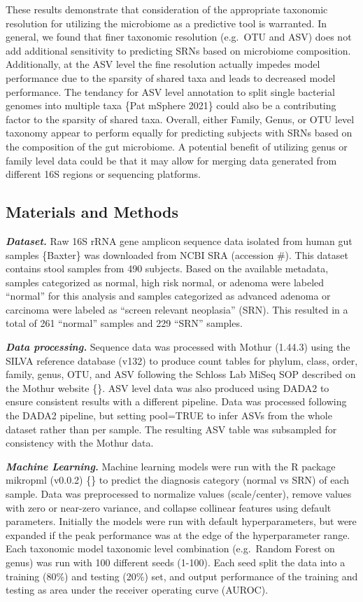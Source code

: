 \documentclass[
]{article}
\begin{document}
These results demonstrate that consideration of the appropriate
taxonomic resolution for utilizing the microbiome as a predictive tool
is warranted. In general, we found that finer taxonomic resolution
(e.g.~OTU and ASV) does not add additional sensitivity to predicting
SRNs based on microbiome composition. Additionally, at the ASV level the
fine resolution actually impedes model performance due to the sparsity
of shared taxa and leads to decreased model performance. The tendancy
for ASV level annotation to split single bacterial genomes into multiple
taxa \{Pat mSphere 2021\} could also be a contributing factor to the
sparsity of shared taxa. Overall, either Family, Genus, or OTU level
taxonomy appear to perform equally for predicting subjects with SRNs
based on the composition of the gut microbiome. A potential benefit of
utilizing genus or family level data could be that it may allow for
merging data generated from different 16S regions or sequencing
platforms.

\hypertarget{materials-and-methods}{%
\subsection{Materials and Methods}\label{materials-and-methods}}

\textbf{\emph{Dataset.}} Raw 16S rRNA gene amplicon sequence data
isolated from human gut samples \{Baxter\} was downloaded from NCBI SRA
(accession \#). This dataset contains stool samples from 490 subjects.
Based on the available metadata, samples categorized as normal, high
risk normal, or adenoma were labeled ``normal'' for this analysis and
samples categorized as advanced adenoma or carcinoma were labeled as
``screen relevant neoplasia'' (SRN). This resulted in a total of 261
``normal'' samples and 229 ``SRN'' samples.

\textbf{\emph{Data processing.}} Sequence data was processed with Mothur
(1.44.3) using the SILVA reference database (v132) to produce count
tables for phylum, class, order, family, genus, OTU, and ASV following
the Schloss Lab MiSeq SOP described on the Mothur website \{\}. ASV
level data was also produced using DADA2 to ensure consistent results
with a different pipeline. Data was processed following the DADA2
pipeline, but setting pool=TRUE to infer ASVs from the whole dataset
rather than per sample. The resulting ASV table was subsampled for
consistency with the Mothur data.

\textbf{\emph{Machine Learning.}} Machine learning models were run with
the R package mikropml (v0.0.2) \{\} to predict the diagnosis category
(normal vs SRN) of each sample. Data was preprocessed to normalize
values (scale/center), remove values with zero or near-zero variance,
and collapse collinear features using default parameters. Initially the
models were run with default hyperparameters, but were expanded if the
peak performance was at the edge of the hyperparameter range. Each
taxonomic model taxonomic level combination (e.g.~Random Forest on
genus) was run with 100 different seeds (1-100). Each seed split the
data into a training (80\%) and testing (20\%) set, and output
performance of the training and testing as area under the receiver
operating curve (AUROC).
\end{document}
